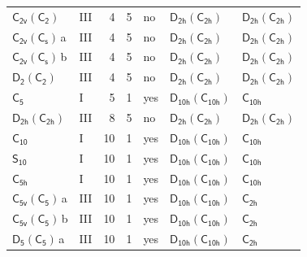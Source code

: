 \documentclass[10pt,a4paper]{article}
\numberwithin{equation}{section}
\newcommand{\grp}[1]{\mathsf{#1}}
\newcommand{\clsletter}[1]{\,{\scriptsize\color{black!55}#1}}
\begin{document}
{\begin{longtable}{@{}llrrlll@{}}
\href{C2v-C2.pdf}{$\grp{C_{2v}}(\grp{C_{2}})$} & III & 4 & 5 & no & \href{D2h-C2h.pdf}{$\grp{D_{2h}}(\grp{C_{2h}})$} & \href{D2h-C2h.pdf}{$\grp{D_{2h}}(\grp{C_{2h}})$}\\
\href{C2v-C1v.pdf}{$\grp{C_{2v}}(\grp{C_{s}})$}\clsletter{a} & III & 4 & 5 & no & \href{D2h-C2h.pdf}{$\grp{D_{2h}}(\grp{C_{2h}})$} & \href{D2h-C2h.pdf}{$\grp{D_{2h}}(\grp{C_{2h}})$}\\
\href{C2v-C1v.pdf}{$\grp{C_{2v}}(\grp{C_{s}})$}\clsletter{b} & III & 4 & 5 & no & \href{D2h-C2h.pdf}{$\grp{D_{2h}}(\grp{C_{2h}})$} & \href{D2h-C2h.pdf}{$\grp{D_{2h}}(\grp{C_{2h}})$}\\
\href{D2-C2.pdf}{$\grp{D_{2}}(\grp{C_{2}})$} & III & 4 & 5 & no & \href{D2h-C2h.pdf}{$\grp{D_{2h}}(\grp{C_{2h}})$} & \href{D2h-C2h.pdf}{$\grp{D_{2h}}(\grp{C_{2h}})$}\\
\href{../../../rotation/data/pdf/C5.pdf}{$\grp{C_{5}}$} & I & 5 & 1 & yes & \href{D10h-C10h.pdf}{$\grp{D_{10h}}(\grp{C_{10h}})$} & \href{../../../rotation/data/pdf/C10h.pdf}{$\grp{C_{10h}}$}\\
\href{D2h-C2h.pdf}{$\grp{D_{2h}}(\grp{C_{2h}})$} & III & 8 & 5 & no & \href{D2h-C2h.pdf}{$\grp{D_{2h}}(\grp{C_{2h}})$} & \href{D2h-C2h.pdf}{$\grp{D_{2h}}(\grp{C_{2h}})$}\\
\href{../../../rotation/data/pdf/C10.pdf}{$\grp{C_{10}}$} & I & 10 & 1 & yes & \href{D10h-C10h.pdf}{$\grp{D_{10h}}(\grp{C_{10h}})$} & \href{../../../rotation/data/pdf/C10h.pdf}{$\grp{C_{10h}}$}\\
\href{../../../rotation/data/pdf/S10.pdf}{$\grp{S_{10}}$} & I & 10 & 1 & yes & \href{D10h-C10h.pdf}{$\grp{D_{10h}}(\grp{C_{10h}})$} & \href{../../../rotation/data/pdf/C10h.pdf}{$\grp{C_{10h}}$}\\
\href{../../../rotation/data/pdf/C5h.pdf}{$\grp{C_{5h}}$} & I & 10 & 1 & yes & \href{D10h-C10h.pdf}{$\grp{D_{10h}}(\grp{C_{10h}})$} & \href{../../../rotation/data/pdf/C10h.pdf}{$\grp{C_{10h}}$}\\
\href{C5v-C5.pdf}{$\grp{C_{5v}}(\grp{C_{5}})$}\clsletter{a} & III & 10 & 1 & yes & \href{D10h-C10h.pdf}{$\grp{D_{10h}}(\grp{C_{10h}})$} & \href{../../../rotation/data/pdf/C2h.pdf}{$\grp{C_{2h}}$}\\
\href{C5v-C5.pdf}{$\grp{C_{5v}}(\grp{C_{5}})$}\clsletter{b} & III & 10 & 1 & yes & \href{D10h-C10h.pdf}{$\grp{D_{10h}}(\grp{C_{10h}})$} & \href{../../../rotation/data/pdf/C2h.pdf}{$\grp{C_{2h}}$}\\
\href{D5-C5.pdf}{$\grp{D_{5}}(\grp{C_{5}})$}\clsletter{a} & III & 10 & 1 & yes & \href{D10h-C10h.pdf}{$\grp{D_{10h}}(\grp{C_{10h}})$} & \href{../../../rotation/data/pdf/C2h.pdf}{$\grp{C_{2h}}$}\\

\end{longtable}}
\end{document}
